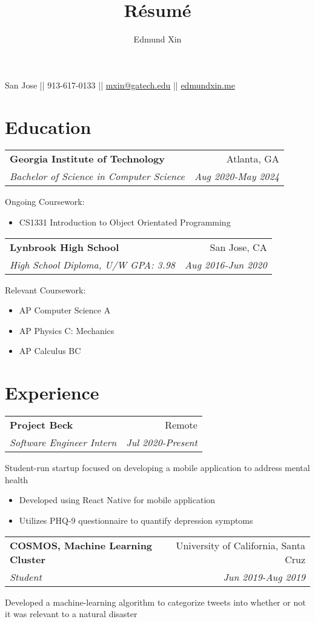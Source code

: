 \documentclass[letterpaper,8pt]{article}
\makeatletter
\renewcommand{\maketitle}{
  \begin{center}
  {\huge\bfseries
  \theauthor}

  \vspace{0.25em}

  San Jose || 913-617-0133 || \href{mailto:mxin@gatech.edu}{mxin@gatech.edu} || \href{https://edmundxin.me}{edmundxin.me}

  \end{center}
}
\newcommand{\resumeSubheading}[4]{
  \vspace{0.25em}
  \begin{tabular*}{0.97\textwidth}[t]{l@{\extracolsep{\fill}}r}
    \textbf{#1} & #2 \\
    \textit{#3} & \textit{#4} \\
  \end{tabular*}\vspace{0.25em}
}
\makeatother
\begin{document}
\title{R\'esum\'e}
\author{Edmund Xin}

\maketitle

\section{Education}

\resumeSubheading{Georgia Institute of Technology}
{Atlanta, GA}{Bachelor of Science in Computer Science
}{Aug 2020-May 2024}
Ongoing Coursework:
\begin{itemize}[label=\raisebox{0.25ex}{\tiny$\bullet$}, font=\small]
  \item CS1331 Introduction to Object Orientated Programming
\end{itemize}


\resumeSubheading{Lynbrook High School}
{San Jose, CA}{High School Diploma, U/W GPA: 3.98}{Aug 2016-Jun 2020}
Relevant Coursework:
\begin{itemize}[label=\raisebox{0.25ex}{\tiny$\bullet$}]
  \item AP Computer Science A
  \item AP Physics C: Mechanics
  \item AP Calculus BC
\end{itemize}


\section{Experience}

\resumeSubheading{Project Beck}{Remote}{Software Engineer Intern}{Jul 2020-Present}

Student-run startup focused on developing a mobile application to address mental health

\begin{itemize}[label=\raisebox{0.25ex}{\tiny$\bullet$}]
  \item Developed using React Native for mobile application
  \item Utilizes PHQ-9 questionnaire to quantify depression symptoms
\end{itemize}

\resumeSubheading{COSMOS, Machine Learning Cluster}
{University of California, Santa Cruz}{Student}{Jun 2019-Aug 2019}

Developed a machine-learning algorithm to categorize tweets into whether or not it was relevant to a natural disaster
\end{document}
